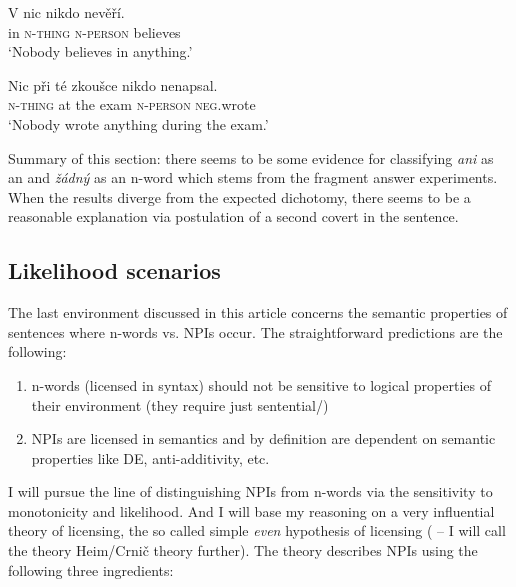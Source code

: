 \documentclass[output=paper, colorlinks, citecolor=brown, newtxmath]{langsci/langscibook}
\begin{document}
\ea\label{ex-39}  \gll V nic nikdo nevěří.\\
in \textsc{n-thing} \textsc{n-person} believes\\
\glt `Nobody believes in anything.'
\z
\z

\ea\label{ex-40} \gll Nic při té zkoušce nikdo nenapsal.\\
\textsc{n-thing} at the exam \textsc{n-person} \textsc{neg}.wrote\\
\glt `Nobody wrote anything during the exam.'
\z
\z

\noindent Summary of this section: there seems to be some evidence for classifying \textit{ani} as an  and \textit{žádný} as an n-word which stems from the fragment answer experiments. When the results diverge from the expected dichotomy, there seems to be a reasonable explanation via postulation of a second covert  in the sentence.

\subsection{Likelihood scenarios}\label{likelihood-scenarios}

The last environment discussed in this article concerns the semantic properties of sentences where n-words vs. NPIs occur. The straightforward predictions are the following:

\begin{enumerate}
  \def\labelenumi{\arabic{enumi})}
  \item
    n-words (licensed in syntax) should not be sensitive to logical properties of
    their environment (they require just sentential/)
  \item
    NPIs are licensed in semantics and by definition are dependent on semantic properties like DE, anti-additivity, etc.
\end{enumerate}

\noindent I will pursue the line of distinguishing NPIs from n-words via the  sensitivity to monotonicity and likelihood. And I will base my reasoning on a very influential theory of  licensing, the so called simple
  \textit{even} hypothesis of  licensing (\citealt{heim1984note,krifka1995semantics,crnivc2014against} -- I will call the theory Heim/Crnič theory further). The theory describes NPIs using the following three ingredients:
\end{document}
